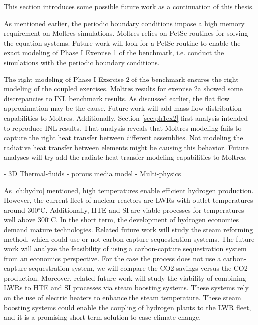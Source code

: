 This section introduces some possible future work as a continuation of this thesis.

As mentioned earlier, the periodic boundary conditions impose a high memory requirement on Moltres simulations.
Moltres relies on PetSc routines for solving the equation systems.
Future work will look for a PetSc routine to enable the exact modeling of Phase I Exercise 1 of the benchmark, i.e. conduct the simulations with the periodic boundary conditions.

The right modeling of Phase I Exercise 2 of the benchmark ensures the right modeling of the coupled exercises.
Moltres results for exercise 2a showed some discrepancies to INL benchmark results.
As discussed earlier, the flat flow approximation may be the cause.
Future work will add mass flow distribution capabilities to Moltres.
Additionally, Section \ref{sec:ph1ex2} first analysis intended to reproduce INL results.
That analysis reveals that Moltres modeling fails to capture the right heat transfer between different assemblies.
Not modeling the radiative heat transfer between elements might be causing this behavior.
Future analyses will try add the radiate heat transfer modeling capabilities to Moltres.

- 3D Thermal-fluids
	- porous media model
	- Multi-physics


As \ref{ch:hydro} mentioned, high temperatures enable efficient hydrogen production.
However, the current fleet of nuclear reactors are LWRs with outlet temperatures around 300$^{\circ}$C.
Additionally, HTE and SI are viable processes for temperatures well above 300$^{\circ}$C.
In the short term, the development of hydrogen economies demand mature technologies.
Related future work will study the steam reforming method, which could use or not carbon-capture sequestration systems.
The future work will analyze the feasibility of using a carbon-capture sequestration system from an economics perspective.
For the case the process does not use a carbon-capture sequestration system, we will compare the \gls{CO2} savings versus the \gls{CO2} production.
Moreover, related future work will study the viability of combining LWRs to HTE and SI processes via steam boosting systems.
These systems rely on the use of electric heaters to enhance the steam temperature.
These steam boosting systems could enable the coupling of hydrogen plants to the LWR fleet, and it is a promising short term solution to ease climate change.
